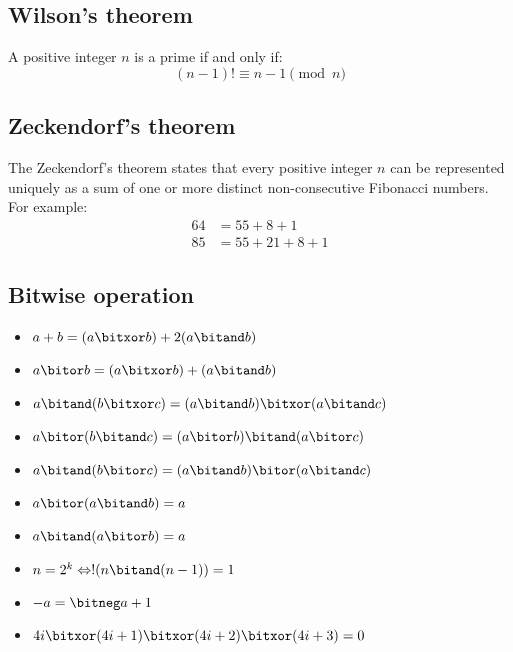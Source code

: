 \subsection{Wilson's theorem}
A positive integer $n$ is a prime if and only if:
\[ (n - 1)! \equiv n - 1 \pmod n \]

\subsection{Zeckendorf’s theorem}
The Zeckendorf's theorem states that every positive integer $n$ can be represented uniquely as a sum of one or more
distinct non-consecutive Fibonacci numbers. For example:
  \vspace{-0.45cm}
  \begin{align*}
    64 &= 55 + 8 + 1 \\
    85 &= 55 + 21 + 8 + 1
  \end{align*}
  \vspace{-0.45cm}

\subsection{Bitwise operation}
\begin{multicols}{2}
\vspace{-\topsep}
\begin{itemize}
    \setlength{\parskip}{0pt}
  \setlength{\itemsep}{0pt plus 1pt}
  \item $a + b = (a \bitxor b) + 2(a \bitand b)$
  \item $a \bitor b = (a \bitxor b) + (a \bitand b)$
  \item $a \bitand (b \bitxor c) = (a \bitand b) \bitxor (a \bitand c)$
  \item $a \bitor (b \bitand c) = (a \bitor b) \bitand (a \bitor c)$
  \item $a \bitand (b \bitor c) = (a \bitand b) \bitor (a \bitand c)$
  \item $a \bitor (a \bitand b) = a$
  \item $a \bitand (a \bitor b) = a$
  \item $n = 2^{k} \Leftrightarrow !(n \bitand (n - 1)) = 1$
  \item $-a = \bitneg a + 1$
  \item $4i \bitxor (4i + 1) \bitxor (4i + 2) \bitxor (4i + 3) = 0$
\end{itemize}
\vspace{-\topsep}
\end{multicols}

